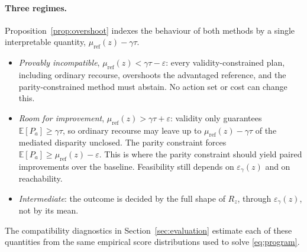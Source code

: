 \paragraph{Three regimes.}
Proposition~\ref{prop:overshoot} indexes the behaviour of both methods by a
single interpretable quantity, $\mu_{\mathrm{ref}}(z)-\gamma\tau$.
\begin{itemize}[nosep]
  \item \emph{Provably incompatible}, $\mu_{\mathrm{ref}}(z)<\gamma\tau-\varepsilon$:
        every validity-constrained plan, including ordinary recourse, overshoots
        the advantaged reference, and the parity-constrained method must abstain.
        No action set or cost can change this.
  \item \emph{Room for improvement}, $\mu_{\mathrm{ref}}(z)>\gamma\tau+\varepsilon$:
        validity only guarantees $\mathbb E[P_a]\ge\gamma\tau$, so ordinary
        recourse may leave up to $\mu_{\mathrm{ref}}(z)-\gamma\tau$ of the mediated
        disparity unclosed. The parity constraint forces
        $\mathbb E[P_a]\ge\mu_{\mathrm{ref}}(z)-\varepsilon$. This is where the
        parity constraint should yield paired improvements over the baseline.
        Feasibility still depends on $\varepsilon_\gamma(z)$ and on reachability.
  \item \emph{Intermediate}: the outcome is decided by the full shape of
        $R_z$, through $\varepsilon_\gamma(z)$, not by its mean.
\end{itemize}
The compatibility diagnostics in Section~\ref{sec:evaluation} estimate each of
these quantities from the same empirical score distributions used to solve
\eqref{eq:program}.
